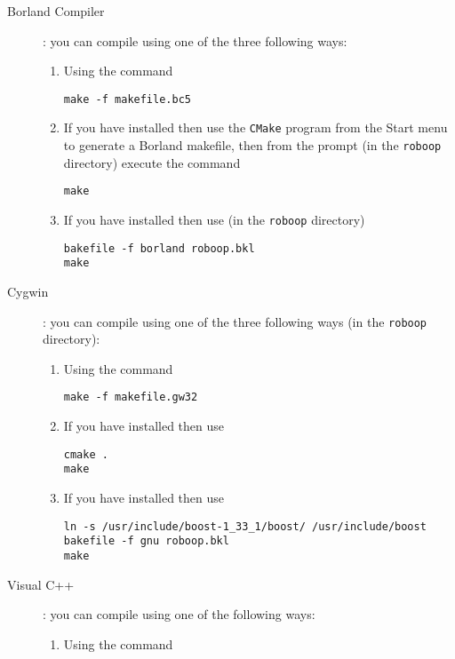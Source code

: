 \documentclass[11pt,fleqn,letterpaper]{report}
\begin{document}
\begin{description}
\item[Borland Compiler] : you can compile using one of the three
  following ways:
  \begin{enumerate}
  \item Using the command 
\begin{verbatim}
make -f makefile.bc5
\end{verbatim}
  \item If you have
    installed then use the \texttt{CMake} program from the
    \textsf{Start} menu to generate a \textsf{Borland makefile}, then
    from the prompt (in the \texttt{roboop} directory) execute the
    command
\begin{verbatim}
make
\end{verbatim}
  \item If you have
    installed then use (in the \texttt{roboop} directory)
\begin{verbatim}
bakefile -f borland roboop.bkl
make
\end{verbatim}
  \end{enumerate}
\item[Cygwin]: you can compile using one of the three following
ways (in the \texttt{roboop} directory):
\begin{enumerate}
\item Using the command 
\begin{verbatim}
make -f makefile.gw32
\end{verbatim}
\item If you have
   installed
  then use
\begin{verbatim}
cmake .
make
\end{verbatim}
\item If you have
  installed then use
\begin{verbatim}
ln -s /usr/include/boost-1_33_1/boost/ /usr/include/boost
bakefile -f gnu roboop.bkl
make
\end{verbatim}
\end{enumerate}
\item[Visual C++]: you can compile using one of the following ways:
  \begin{enumerate}
  \item Using the command 

\end{enumerate}
\end{description}
\end{document}
